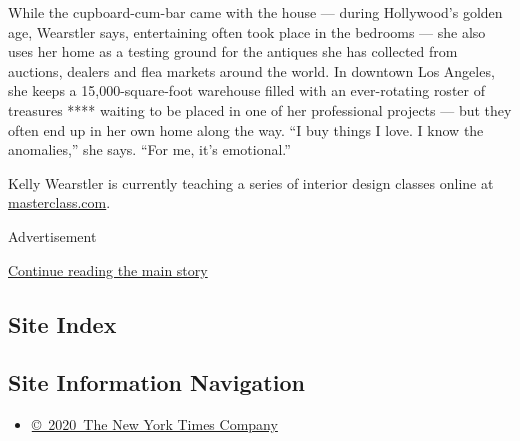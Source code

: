While the cupboard-cum-bar came with the house --- during Hollywood's
golden age, Wearstler says, entertaining often took place in the
bedrooms --- she also uses her home as a testing ground for the antiques
she has collected from auctions, dealers and flea markets around the
world. In downtown Los Angeles, she keeps a 15,000-square-foot warehouse
filled with an ever-rotating roster of treasures **** waiting to be
placed in one of her professional projects --- but they often end up in
her own home along the way. ``I buy things I love. I know the
anomalies,'' she says. ``For me, it's emotional.''

Kelly Wearstler is currently teaching a series of interior design
classes online at
\href{https://www.masterclass.com/classes/kelly-wearstler-teaches-interior-design}{masterclass.com}.

Advertisement

\protect\hyperlink{after-bottom}{Continue reading the main story}

\hypertarget{site-index}{%
\subsection{Site Index}\label{site-index}}

\hypertarget{site-information-navigation}{%
\subsection{Site Information
Navigation}\label{site-information-navigation}}

\begin{itemize}
\tightlist
\item
  \href{https://help.nytimes.com/hc/en-us/articles/115014792127-Copyright-notice}{©~2020~The
  New York Times Company}
\end{itemize}

